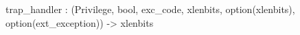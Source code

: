 trap_handler : (Privilege, bool, exc_code, xlenbits, option(xlenbits), option(ext_exception)) -> xlenbits